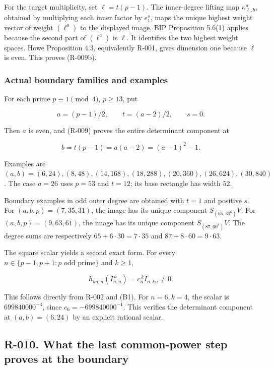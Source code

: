 \documentclass[
  10pt,
]{article}
\begin{document}
For the target multiplicity, set \(\ell=t(p-1)\). The inner-degree
lifting map \(\kappa^a_{\ell,b}\), obtained by multiplying each inner
factor by \(e_1^s\), maps the unique highest weight vector of weight
\((\ell^a)\) to the displayed image. BIP Proposition 5.6(1) applies
because the second part of \((\ell^a)\) is \(\ell\). It identifies the
two highest weight spaces. Howe Proposition 4.3, equivalently R-001,
gives dimension one because \(\ell\) is even. This proves (R-009b).

\subsubsection{Actual boundary families and
examples}\label{actual-boundary-families-and-examples}

For each prime \(p\equiv1\pmod4\), \(p\ge13\), put

\[
 a=(p-1)/2,\qquad t=(a-2)/2,\qquad s=0.
\]

Then \(a\) is even, and (R-009) proves the entire determinant component
at

\[
 b=t(p-1)=a(a-2)=(a-1)^2-1.
 \tag{B9}
\]

Examples are \((a,b)=(6,24),(8,48),(14,168),(18,288),(20,360),
(26,624),(30,840)\). The case \(a=26\) uses \(p=53\) and \(t=12\); its
base rectangle has width \(52\).

Boundary examples in odd outer degree are obtained with \(t=1\) and
positive \(s\). For \((a,b,p)=(7,35,31)\), the image has its unique
component \(S_{(65,30^6)}V\). For \((a,b,p)=(9,63,61)\), the image has
its unique component \(S_{(87,60^8)}V\). The degree sums are
respectively \(65+6\cdot30=7\cdot35\) and \(87+8\cdot60=9\cdot63\).

The square scalar yields a second exact form. For every
\(n\in\{p-1,p+1:p\text{ odd prime}\}\) and \(k\ge1\),

\[
 h_{kn,n}(I_{n,n}^{\,k})=c_n^{\,k}I_{n,kn}\ne0.
 \tag{B10}
\]

This follows directly from R-002 and (B1). For \(n=6,k=4\), the scalar
is \(699840000^{-4}\), since \(c_6=-699840000^{-1}\). This verifies the
determinant component at \((a,b)=(6,24)\) by an explicit rational
scalar.

\subsection{R-010. What the last common-power step proves at the
boundary}\label{r-010.-what-the-last-common-power-step-proves-at-the-boundary}
\end{document}

